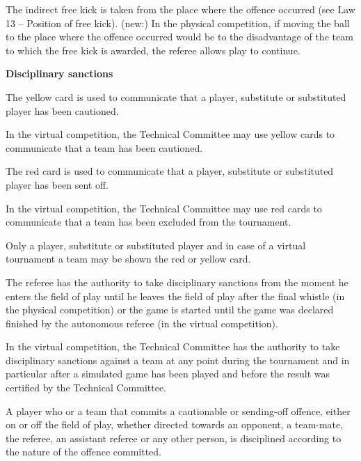   \bigskip


The indirect free kick is taken from the place where the offence occurred (see Law 13 -- Position of free kick).
(new:) In the physical competition, if moving the ball to the place where the offence occurred would be to the disadvantage of the team to which the free kick is awarded, the referee allows play to continue.

\bigskip

{\bfseries Disciplinary sanctions}

\headlinebox

The yellow card is used to communicate that a player, substitute or substituted player has been cautioned.

In the virtual competition, the Technical Committee may use yellow cards to communicate that a team has been cautioned.

\bigskip

The red card is used to communicate that a player, substitute or substituted player has been sent off.

In the virtual competition, the Technical Committee may use red cards to communicate that a team has been excluded from the tournament.

\bigskip

Only a player, substitute or substituted player and in case of a virtual tournament a team may be shown the red or yellow card.

\bigskip

The referee has the authority to take disciplinary sanctions from the moment he enters the field of play until he leaves the field of play after the final whistle (in the physical competition)
or the game is started until the game was declared finished by the autonomous referee (in the virtual competition).

In the virtual competition, the Technical Committee has the authority to take disciplinary sanctions against a team at any point during the tournament and in particular after a simulated game has been played and before the result was certified by the Technical Committee.

\bigskip

A player who or a team that commits a cautionable or sending-off offence, either on or off the field of play, whether directed towards an opponent, a team-mate, the referee, an assistant referee or any other person, is disciplined according to the nature of the offence committed.

\bigskip

